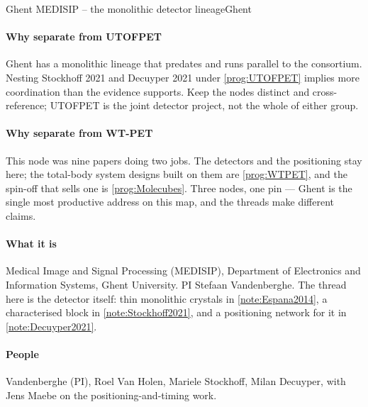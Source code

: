 \begin{programnote}{Ghent MEDISIP -- the monolithic detector lineage}{Ghent}

\paragraph{Why separate from UTOFPET}
Ghent has a monolithic lineage that predates and runs parallel to the
consortium. Nesting Stockhoff 2021 and Decuyper 2021 under \ref{prog:UTOFPET}
implies more coordination than the evidence supports. Keep the nodes distinct
and cross-reference; UTOFPET is the joint detector project, not the whole of
either group.

\paragraph{Why separate from WT-PET}
This node was nine papers doing two jobs. The detectors and the positioning
stay here; the total-body system designs built on them are \ref{prog:WTPET},
and the spin-off that sells one is \ref{prog:Molecubes}. Three nodes, one pin
--- Ghent is the single most productive address on this map, and the threads
make different claims.

\paragraph{What it is}
Medical Image and Signal Processing (MEDISIP), Department of Electronics and
Information Systems, Ghent University. PI Stefaan Vandenberghe. The thread
here is the detector itself: thin monolithic crystals in
\ref{note:Espana2014}, a characterised  block
in \ref{note:Stockhoff2021}, and a positioning network for it in
\ref{note:Decuyper2021}.

\paragraph{People}
Vandenberghe (PI), Roel Van Holen, Mariele Stockhoff, Milan Decuyper, with
Jens Maebe on the positioning-and-timing work.


\end{programnote}
